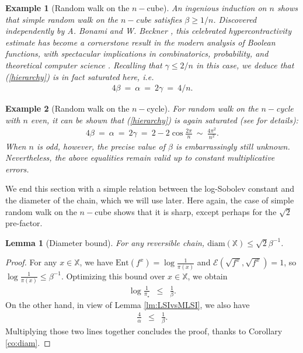 \documentclass[12pt,final]{article}
\newtheorem{lemma}{Lemma}[section]
\newtheorem{example}{Example}[section]
\numberwithin{equation}{section}
\newcommand{\Ent}{\mathrm{Ent}}
\newcommand{\cE}{\mathscr {E}}
\newcommand{\dX}{\mathbb{X}}
\newcommand{\diam}{\mathrm{diam}}
\begin{document}
\begin{example}[Random walk on the $n-$cube]An ingenious induction on $n$ shows that  simple random walk on the $n-$cube satisfies $\beta\ge 1/n$. Discovered independently by A. Bonami and W. Beckner \cite{MR283496,MR385456}, this celebrated hypercontractivity estimate has become a cornerstone result in the modern analysis of Boolean functions, with spectacular implications in combinatorics, probability, and theoretical computer science \cite{MR3443800,MR4732718}. Recalling that $\gamma\le 2/n$ in this case, we deduce that (\ref{hierarchy}) is in fact saturated here, i.e.
\begin{eqnarray*}
4\beta \ = \ \alpha\ =\ 2\gamma \ =\ 4/n.
 \end{eqnarray*}  
\end{example}
\begin{example}[Random walk on the $n-$cycle]For random walk on the $n-$cycle with $n$ even, it can be shown that  (\ref{hierarchy}) is again saturated (see \cite{MR1990534} for details):
  \begin{eqnarray*}
4\beta \ = \ \alpha\ =\ 2\gamma \ =\ 2-2\cos\frac{2\pi}{n} \ \sim \ \frac{4\pi^2}{n^2}.
 \end{eqnarray*}
When $n$ is odd, however, the precise value of $\beta$ is embarrassingly still unknown. Nevertheless, the above equalities remain valid up to constant multiplicative errors.
\end{example}
We end this section with a simple  relation between the log-Sobolev constant and the diameter of the chain, which we will use later. Here again, the case of simple random walk on the $n-$cube shows that it  is sharp, except perhaps for the $\sqrt{2}$ pre-factor.  
\begin{lemma}[Diameter bound]\label{lm:diamLSI}
For any reversible chain,  $\diam(\dX)  \leq \sqrt{2}\beta^{-1}$. 
\end{lemma}
\begin{proof}
For any $x\in\dX$, we have 
$
\Ent(f^x) =  \log\frac{1}{\pi(x)}$ and  $\cE(\sqrt{f^x},\sqrt{f^x}) = 1$, so $\log\frac{1}{\pi(x)}\le \beta^{-1}$. Optimizing this bound over $x\in\dX$, we obtain
\begin{eqnarray}
\label{LSvsDimension}
\log \frac{1}{\pi_\star} & \le & \frac 1\beta.
\end{eqnarray} 
On the other hand, in view of Lemma \ref{lm:LSIvsMLSI}, we also have
\begin{eqnarray*}
\frac{4}{\alpha} & \le & \frac{1}{\beta}.
\end{eqnarray*}
Multiplying those two lines together concludes the proof, thanks to 
 Corollary \ref{co:diam}. 
\end{proof}
\end{document}
